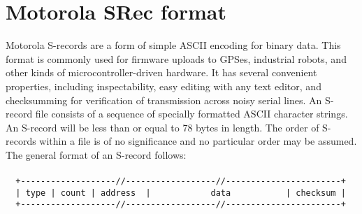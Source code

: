         \section{Motorola SRec format}
                Motorola S-records are a form of simple ASCII encoding for binary data.
            This format is commonly used for firmware uploads to GPSes, industrial
            robots, and other kinds of microcontroller-driven hardware. It has
            several convenient properties, including inspectability, easy editing
            with any text editor, and checksumming for verification of transmission
            across noisy serial lines. An S-record file consists of a sequence of specially formatted ASCII
            character strings. An S-record will be less than or equal to 78 bytes
            in length. The order of S-records within a file is of no significance and no
            particular order may be assumed.\\
            The general format of an S-record follows:
                    {
                        ~\\
                        \usecodefont\\
                        \verb'  +-------------------//------------------//-----------------------+'\\
                        \verb'  | type | count | address  |            data           | checksum |'\\
                        \verb'  +-------------------//------------------//-----------------------+'\\
                    }\\

